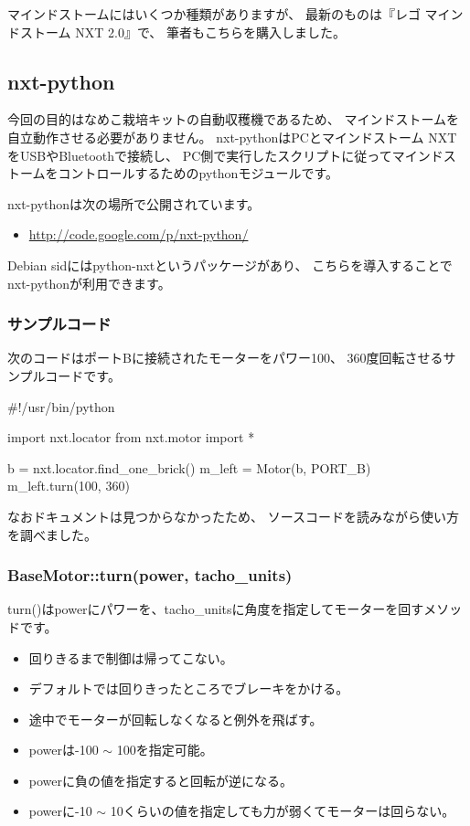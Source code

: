 \documentclass[mingoth,a4paper]{jsarticle}
\begin{document}
マインドストームにはいくつか種類がありますが、
最新のものは『レゴ マインドストーム NXT 2.0』で、
筆者もこちらを購入しました。

\subsection{nxt-python}
今回の目的はなめこ栽培キットの自動収穫機であるため、
マインドストームを自立動作させる必要がありません。
nxt-pythonはPCとマインドストーム NXTをUSBやBluetoothで接続し、
PC側で実行したスクリプトに従ってマインドストームをコントロールするためのpythonモジュールです。

nxt-pythonは次の場所で公開されています。
\begin{itemize}
\item \url{http://code.google.com/p/nxt-python/}
\end{itemize}

Debian sidにはpython-nxtというパッケージがあり、
こちらを導入することでnxt-pythonが利用できます。


\subsubsection{サンプルコード}
次のコードはポートBに接続されたモーターをパワー100、
360度回転させるサンプルコードです。

\begin{commandline}
#!/usr/bin/python

import nxt.locator
from nxt.motor import *

b = nxt.locator.find_one_brick()
m_left = Motor(b, PORT_B)
m_left.turn(100, 360)
\end{commandline}

なおドキュメントは見つからなかったため、
ソースコードを読みながら使い方を調べました。

\subsubsection{BaseMotor::turn(power, tacho\_units)}

turn()はpowerにパワーを、tacho\_unitsに角度を指定してモーターを回すメソッドです。
\begin{itemize}
\item 回りきるまで制御は帰ってこない。
\item デフォルトでは回りきったところでブレーキをかける。
\item 途中でモーターが回転しなくなると例外を飛ばす。
\item powerは-100 $\sim$ 100を指定可能。
\item powerに負の値を指定すると回転が逆になる。
\item powerに-10 $\sim$ 10くらいの値を指定しても力が弱くてモーターは回らない。
\end{itemize}
\end{document}
